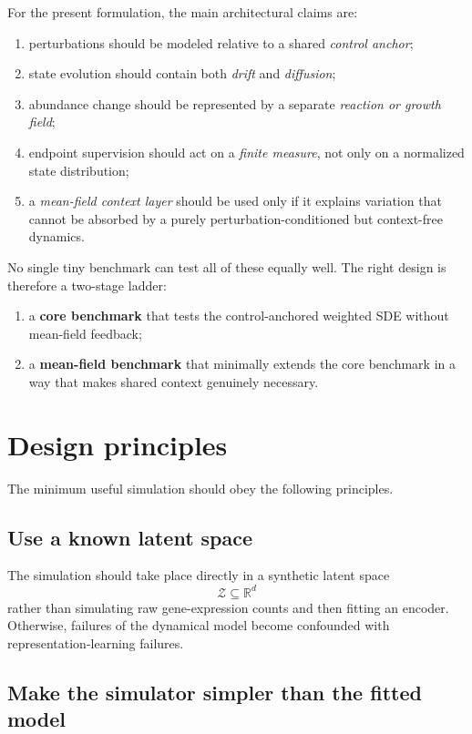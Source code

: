 \documentclass[11pt]{article}
\newcommand{\R}{\mathbb{R}}
\newcommand{\Zcal}{\mathcal{Z}}
\begin{document}
For the present formulation, the main architectural claims are:
\begin{enumerate}[label=(C\arabic*),leftmargin=2.6em]
    \item perturbations should be modeled relative to a shared \emph{control anchor};
    \item state evolution should contain both \emph{drift} and \emph{diffusion};
    \item abundance change should be represented by a separate \emph{reaction or growth field};
    \item endpoint supervision should act on a \emph{finite measure}, not only on a normalized state distribution;
    \item a \emph{mean-field context layer} should be used only if it explains variation that cannot be absorbed by a purely perturbation-conditioned but context-free dynamics.
\end{enumerate}

No single tiny benchmark can test all of these equally well. The right design is therefore a two-stage ladder:
\begin{enumerate}[label=(S\arabic*),leftmargin=2.6em]
    \item a \textbf{core benchmark} that tests the control-anchored weighted SDE without mean-field feedback;
    \item a \textbf{mean-field benchmark} that minimally extends the core benchmark in a way that makes shared context genuinely necessary.
\end{enumerate}

\section{Design principles}

The minimum useful simulation should obey the following principles.

\subsection{Use a known latent space}

The simulation should take place directly in a synthetic latent space
\[
\Zcal \subseteq \R^d
\]
rather than simulating raw gene-expression counts and then fitting an encoder. Otherwise, failures of the dynamical model become confounded with representation-learning failures.

\subsection{Make the simulator simpler than the fitted model}
\end{document}
